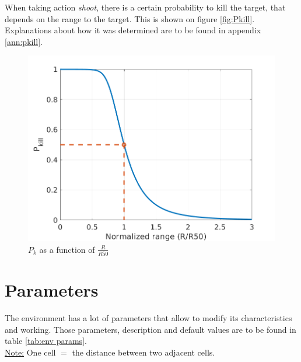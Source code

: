 When taking action \textit{shoot}, there is a certain probability to kill the target, that depends on the range to the target. This is shown on figure \ref{fig:Pkill}. Explanations about how it was determined are to be found in appendix \ref{ann:pkill}.

\begin{figure}[h!] \label{fig:Pkill}
    \centering
    \includegraphics[width=.7\textwidth]{images/pkill.png}
    \caption{$P_k$ as a function of $\frac{R}{R50}$}
    \label{fig:my_label}
\end{figure}

\section{Parameters}

The environment has a lot of parameters that allow to modify its characteristics and working. Those parameters, description and default values are to be found in table \ref{tab:env params}. \\\underline{Note:} One cell $=$ the distance between two adjacent cells.

